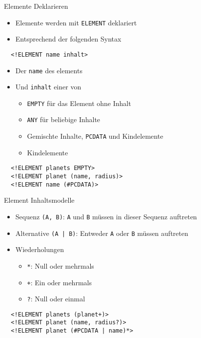 \documentclass{beamer}
\begin{document}
\begin{frame}[fragile]{Elemente Deklarieren}
	
	\begin{itemize}
		\item Elemente werden mit \texttt{ELEMENT} deklariert
		\item Entsprechend der folgenden Syntax
	\end{itemize}
	
	\lstset{language=XML}
	\begin{lstlisting}
  <!ELEMENT name inhalt>
	\end{lstlisting}
	
	\begin{itemize}
		\item Der \texttt{name} des elements
		\item Und \texttt{inhalt} einer von
		\begin{itemize}
			\item \texttt{EMPTY} für das Element ohne Inhalt
			\item \texttt{ANY} für beliebige Inhalte
			\item Gemischte Inhalte, \texttt{PCDATA} und Kindelemente
			\item Kindelemente
		\end{itemize}
	\end{itemize}
	
	\begin{lstlisting}
  <!ELEMENT planets EMPTY>
  <!ELEMENT planet (name, radius)>
  <!ELEMENT name (#PCDATA)>
	\end{lstlisting}
		
\end{frame}

\begin{frame}[fragile]{Element Inhaltsmodelle}
	
	\begin{itemize}
		\item Sequenz \texttt{(A, B)}: \texttt{A} und \texttt{B} müssen in dieser Sequenz auftreten
		\item Alternative \texttt{(A | B)}: Entweder \texttt{A} oder \texttt{B} müssen auftreten
		\item Wiederholungen
		\begin{itemize}
			\item \texttt{*}: Null oder mehrmals
			\item \texttt{+}: Ein oder mehrmals
			\item \texttt{?}: Null oder einmal
		\end{itemize}
	\end{itemize}
	
	\begin{lstlisting}
  <!ELEMENT planets (planet+)>
  <!ELEMENT planet (name, radius?)>
  <!ELEMENT planet (#PCDATA | name)*>
	\end{lstlisting}
	
\end{frame}
\end{document}
